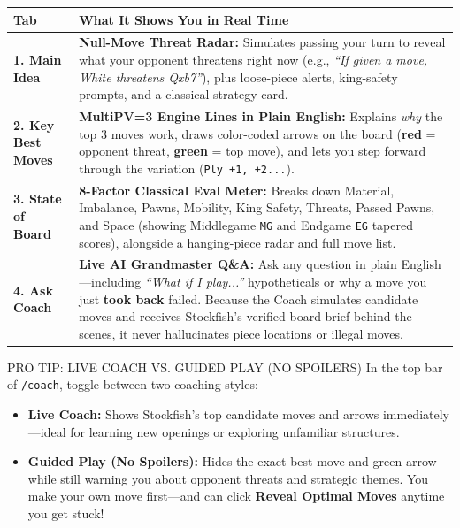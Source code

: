 \documentclass[10pt,twoside]{article}
\begin{document}
\footnotesize
\begin{tabularx}{\textwidth}{@{}lX@{}}
\toprule
\textbf{\sffamily Tab} & \textbf{\sffamily What It Shows You in Real Time} \\
\midrule
\textbf{1. Main Idea} &
  \textbf{Null-Move Threat Radar:} Simulates passing your turn to reveal what your opponent threatens right now (e.g., \emph{``If given a move, White threatens Qxb7''}), plus loose-piece alerts, king-safety prompts, and a classical strategy card. \\[4pt]
\textbf{2. Key Best Moves} &
  \textbf{MultiPV=3 Engine Lines in Plain English:} Explains \emph{why} the top 3 moves work, draws color-coded arrows on the board (\textcolor{alertred}{\textbf{red}} = opponent threat, \textcolor{goodgreen}{\textbf{green}} = top move), and lets you step forward through the variation (\texttt{Ply +1, +2...}). \\[4pt]
\textbf{3. State of Board} &
  \textbf{8-Factor Classical Eval Meter:} Breaks down Material, Imbalance, Pawns, Mobility, King Safety, Threats, Passed Pawns, and Space (showing Middlegame \texttt{MG} and Endgame \texttt{EG} tapered scores), alongside a hanging-piece radar and full move list. \\[4pt]
\textbf{4. Ask Coach} &
  \textbf{Live AI Grandmaster Q\&A:} Ask any question in plain English---including \emph{``What if I play...''} hypotheticals or why a move you just \textbf{took back} failed. Because the Coach simulates candidate moves and receives Stockfish's verified board brief behind the scenes, it never hallucinates piece locations or illegal moves. \\
\bottomrule
\end{tabularx}
\normalsize

\vspace{4pt}
\begin{supplementbox}{PRO TIP: LIVE COACH VS. GUIDED PLAY (NO SPOILERS)}
\footnotesize
In the top bar of \texttt{/coach}, toggle between two coaching styles:
\begin{itemize}[leftmargin=12pt, itemsep=2pt, topsep=2pt]
  \item \textbf{Live Coach:} Shows Stockfish's top candidate moves and arrows immediately---ideal for learning new openings or exploring unfamiliar structures.
  \item \textbf{Guided Play (No Spoilers):} Hides the exact best move and green arrow while still warning you about opponent threats and strategic themes. You make your own move first---and can click \textbf{Reveal Optimal Moves} anytime you get stuck!
\end{itemize}
\end{supplementbox}
\end{document}
